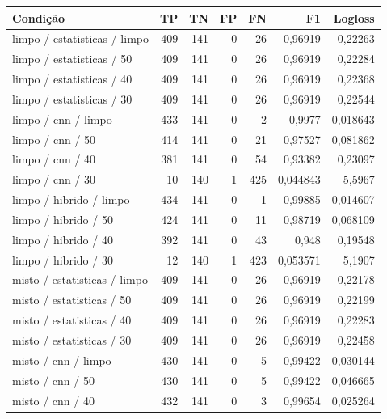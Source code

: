 \small\begin{longtable}{@{}p{.38\linewidth}rrrrrr@{}}
\toprule Condição & TP & TN & FP & FN & F1 & Logloss\\\midrule\endhead
limpo /\allowbreak{} estatisticas /\allowbreak{} limpo & 409 & 141 & 0 & 26 & 0,96919 & 0,22263\\
limpo /\allowbreak{} estatisticas /\allowbreak{} 50 & 409 & 141 & 0 & 26 & 0,96919 & 0,22284\\
limpo /\allowbreak{} estatisticas /\allowbreak{} 40 & 409 & 141 & 0 & 26 & 0,96919 & 0,22368\\
limpo /\allowbreak{} estatisticas /\allowbreak{} 30 & 409 & 141 & 0 & 26 & 0,96919 & 0,22544\\
limpo /\allowbreak{} cnn /\allowbreak{} limpo & 433 & 141 & 0 & 2 & 0,9977 & 0,018643\\
limpo /\allowbreak{} cnn /\allowbreak{} 50 & 414 & 141 & 0 & 21 & 0,97527 & 0,081862\\
limpo /\allowbreak{} cnn /\allowbreak{} 40 & 381 & 141 & 0 & 54 & 0,93382 & 0,23097\\
limpo /\allowbreak{} cnn /\allowbreak{} 30 & 10 & 140 & 1 & 425 & 0,044843 & 5,5967\\
limpo /\allowbreak{} hibrido /\allowbreak{} limpo & 434 & 141 & 0 & 1 & 0,99885 & 0,014607\\
limpo /\allowbreak{} hibrido /\allowbreak{} 50 & 424 & 141 & 0 & 11 & 0,98719 & 0,068109\\
limpo /\allowbreak{} hibrido /\allowbreak{} 40 & 392 & 141 & 0 & 43 & 0,948 & 0,19548\\
limpo /\allowbreak{} hibrido /\allowbreak{} 30 & 12 & 140 & 1 & 423 & 0,053571 & 5,1907\\
misto /\allowbreak{} estatisticas /\allowbreak{} limpo & 409 & 141 & 0 & 26 & 0,96919 & 0,22178\\
misto /\allowbreak{} estatisticas /\allowbreak{} 50 & 409 & 141 & 0 & 26 & 0,96919 & 0,22199\\
misto /\allowbreak{} estatisticas /\allowbreak{} 40 & 409 & 141 & 0 & 26 & 0,96919 & 0,22283\\
misto /\allowbreak{} estatisticas /\allowbreak{} 30 & 409 & 141 & 0 & 26 & 0,96919 & 0,22458\\
misto /\allowbreak{} cnn /\allowbreak{} limpo & 430 & 141 & 0 & 5 & 0,99422 & 0,030144\\
misto /\allowbreak{} cnn /\allowbreak{} 50 & 430 & 141 & 0 & 5 & 0,99422 & 0,046665\\
misto /\allowbreak{} cnn /\allowbreak{} 40 & 432 & 141 & 0 & 3 & 0,99654 & 0,025264\\

\end{longtable}
